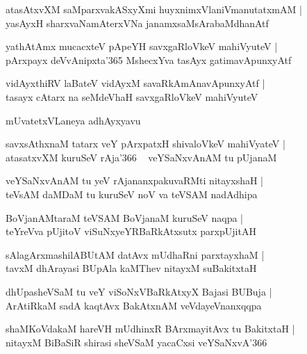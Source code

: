 \documentclass[twoside,12pt,openright]{book}
\newcounter{shloka}[chapter]
\begin{document}
\begin{shloka}%
atasAtxvXM saMparxvakASxyXmi huyxnimxVlaniVmanutatxmAM |\\
yasAyxH sharxvaNamAterxVNa janamxsaMsArabaMdhanAtf
\end{shloka}

\begin{shloka}%
yathAtAmx mucacxteV pApeYH savxgaRloVkeV mahiVyuteV |\\
pArxpayx deVvAnipxta\char'365 MshecxYva tasAyx gatimavApunxyAtf
\end{shloka}

\begin{shloka}%
vidAyxthiRV laBateV vidAyxM savaRkAmAnavApunxyAtf |\\
tasayx cAtarx na seMdeVhaH savxgaRloVkeV mahiVyuteV 
\end{shloka}

\begin{center}
mUvatetxVLaneya adhAyxyavu
\end{center}

\begin{shloka}%
savxsAthxnaM tatarx veY pArxpatxH shivaloVkeV mahiVyateV |\\
atasatxvXM kuruSeV rAja\char'366 ~ veYSaNxvAnAM tu pUjanaM 
\end{shloka}

\begin{shloka}%
veYSaNxvAnAM tu yeV rAjananxpakuvaRMti nitayxshaH |\\
teVsAM daMDaM tu kuruSeV noV va teVSAM nadAdhipa
\end{shloka}

\begin{shloka}%
BoVjanAMtaraM teVSAM BoVjanaM kuruSeV naqpa |\\
teYreVva pUjitoV viSuNxyeYRBaRkAtxsutx parxpUjitAH 
\end{shloka}

\begin{shloka}%
sAlagArxmashilABUtAM datAvx mUdhaRni parxtayxhaM |\\
tavxM dhArayasi BUpAla kaMThev nitayxM suBakitxtaH 
\end{shloka}

\begin{shloka}%
dhUpasheVSaM tu veY viSoNxVBaRkAtxyX Bajasi BUBuja |\\
ArAtiRkaM sadA kaqtAvx BakAtxnAM veVdayeVnanxqqpa
\end{shloka}

\begin{shloka}%
shaMKoVdakaM hareVH mUdhinxR BArxmayitAvx tu BakitxtaH |\\
nitayxM BiBaSiR shirasi sheVSaM yacaCxsi veYSaNxvA\char'366 
\end{shloka}
\end{document}
